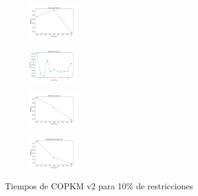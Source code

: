 \begin{figure}[H]
\begin{subfigure}
    \end{subfigure}
    \hfill
    \begin{subfigure}
        \centering
        \includegraphics[width=0.234\textwidth]{img/copkm2/iris_set_const_10_3773969821_time.png}
    \end{subfigure}
    \hfill
    \begin{subfigure}
        \centering
        \includegraphics[width=0.234\textwidth]{img/copkm2/ecoli_set_const_10_3773969821_time.png}
    \end{subfigure}
    \hfill
    \begin{subfigure}
        \centering
        \includegraphics[width=0.234\textwidth]{img/copkm2/rand_set_const_10_3773969821_time.png}
    \end{subfigure}
    \hfill
    \begin{subfigure}
        \centering
        \includegraphics[width=0.234\textwidth]{img/copkm2/newthyroid_set_const_10_3773969821_time.png}
    \end{subfigure}
    \caption{Tiempos de COPKM v2 para 10\% de restricciones}
\end{figure}

\vspace*{\fill}
\newpage
\vspace*{\fill}

